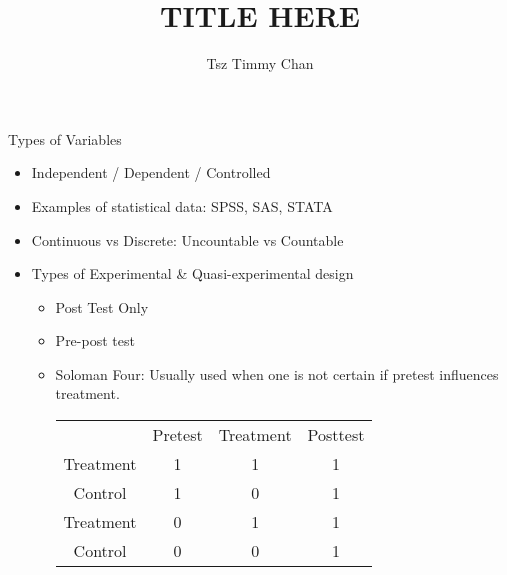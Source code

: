 \documentclass{TC}
\title{TITLE HERE}	%
\author{Tsz Timmy Chan}	%
\begin{document}
Types of Variables

\begin{itemize}
\item Independent / Dependent / Controlled
\item Examples of statistical data: SPSS, SAS, STATA
\item Continuous vs Discrete: Uncountable vs Countable 

\item Types of Experimental \& Quasi-experimental design
	\begin{itemize}
	\item  Post Test Only
	\item Pre-post test
	\item Soloman Four: Usually used when one is not certain if pretest influences treatment.\\
		\begin{tabular}{c|c|c|c}
			& Pretest & Treatment & Posttest \\
		Treatment & 1 & 1 & 1 \\
		Control & 1 & 0 & 1 \\
		Treatment & 0 & 1 & 1 \\
		Control & 0 & 0 & 1
		\end{tabular}
	\end{itemize}
\end{itemize}
\end{document}

